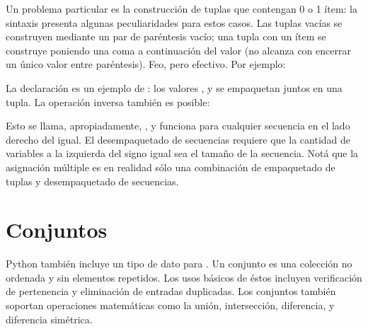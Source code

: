 \documentclass[a5paper,10pt,spanish]{sphinxmanual}
\begin{document}
\sphinxAtStartPar
Un problema particular es la construcción de tuplas que contengan 0 o 1 ítem: la sintaxis presenta algunas peculiaridades para estos casos.  Las tuplas vacías se construyen mediante un par de paréntesis vacío; una tupla con un ítem se construye poniendo una coma a continuación del valor (no alcanza con encerrar un único valor entre paréntesis).  Feo, pero efectivo.  Por ejemplo:

\begin{sphinxVerbatim}[commandchars=\\\{\}]
  
      
\end{sphinxVerbatim}

\sphinxAtStartPar
La declaración  es un ejemplo de : los valores ,  y  se empaquetan juntos en una tupla. La operación inversa también es posible:

\begin{sphinxVerbatim}[commandchars=\\\{\}]
    
\end{sphinxVerbatim}

\sphinxAtStartPar
Esto se llama, apropiadamente, , y funciona para cualquier secuencia en el lado derecho del igual.  El desempaquetado de secuencias requiere que la cantidad de variables a la izquierda del signo igual sea el tamaño de la secuencia.  Notá que la asignación múltiple es en realidad sólo una combinación de empaquetado de tuplas y desempaquetado de secuencias.


\section{Conjuntos}
\label{\detokenize{tutorial/datastructures:sets}}\label{\detokenize{tutorial/datastructures:tut-sets}}
\sphinxAtStartPar
Python también incluye un tipo de dato para .  Un conjunto es una colección no ordenada y sin elementos repetidos.  Los usos básicos de éstos incluyen verificación de pertenencia y eliminación de entradas duplicadas. Los conjuntos también soportan operaciones matemáticas como la unión, intersección, diferencia, y diferencia simétrica.
\end{document}
